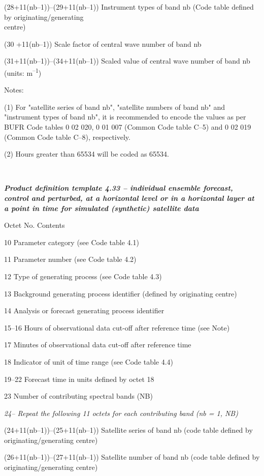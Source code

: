 (28+11(nb--1))--(29+11(nb--1)) Instrument types of band nb (Code table defined by originating/generating\\
centre)

(30 +11(nb--1)) Scale factor of central wave number of band nb

(31+11(nb--1))--(34+11(nb--1)) Scaled value of central wave number of band nb (units: m\textsuperscript{--1})

Notes:

(1) For "satellite series of band nb", "satellite numbers of band nb" and "instrument types of band nb", it is recommended to encode the values as per BUFR Code tables 0 02 020, 0 01 007 (Common Code table C--5) and 0 02 019 (Common Code table C--8), respectively.

(2) Hours greater than 65534 will be coded as 65534.

\emph{\textbf{\\
}}

\emph{\textbf{Product definition template 4.33 -- individual ensemble forecast, control and perturbed, at a horizontal level or in a horizontal layer at a point in time for simulated (synthetic) satellite data}}

Octet No. Contents

10 Parameter category (see Code table 4.1)

11 Parameter number (see Code table 4.2)

12 Type of generating process (see Code table 4.3)

13 Background generating process identifier (defined by originating centre)

14 Analysis or forecast generating process identifier

15--16 Hours of observational data cut-off after reference time (see Note)

17 Minutes of observational data cut-off after reference time

18 Indicator of unit of time range (see Code table 4.4)

19--22 Forecast time in units defined by octet 18

23 Number of contributing spectral bands (NB)

\emph{24-- Repeat the following 11 octets for each contributing band (nb = 1, NB)}

(24+11(nb--1))--(25+11(nb--1)) Satellite series of band nb (code table defined by originating/generating centre)

(26+11(nb--1))--(27+11(nb--1)) Satellite number of band nb (code table defined by originating/generating centre)

